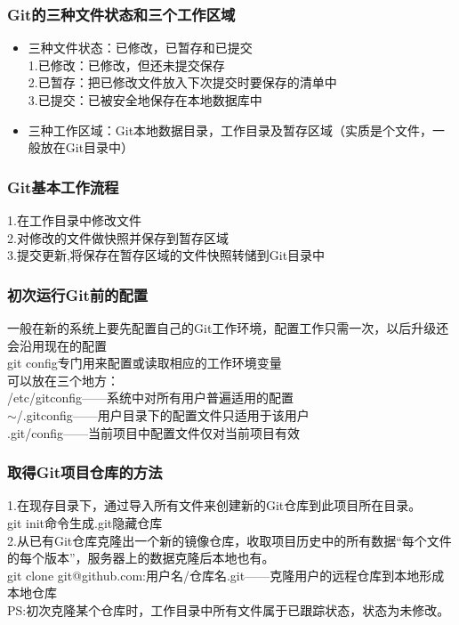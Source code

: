 \documentclass[12pt]{article}
\begin{document}
\begin{flushleft}
\begin{flushleft}
\begin{flushleft}
\begin{flushleft}
\subsubsection{Git的三种文件状态和三个工作区域}
\begin{flushleft}
\begin{itemize}
\item{\color{blue}三种文件状态：}已修改，已暂存和已提交\\
1.已修改：已修改，但还未提交保存\\
2.已暂存：把已修改文件放入下次提交时要保存的清单中\\
3.已提交：已被安全地保存在本地数据库中\\
\item{\color{blue}三种工作区域：}Git本地数据目录，工作目录及暂存区域（实质是个文件，一般放在Git目录中）
\end{itemize}
\end{flushleft}
\subsubsection{Git基本工作流程}
\begin{flushleft}
1.在工作目录中修改文件\\
2.对修改的文件做快照并保存到暂存区域\\
3.提交更新,将保存在暂存区域的文件快照转储到Git目录中
\end{flushleft}
\subsubsection{初次运行Git前的配置}
\begin{flushleft}
一般在新的系统上要先配置自己的Git工作环境，配置工作只需一次，以后升级还会沿用现在的配置\\
git config专门用来配置或读取相应的工作环境变量\\
可以放在三个地方：\\
\slash{}etc\slash{}gitconfig——系统中对所有用户普遍适用的配置\\
$\sim$\slash{}.gitconfig——用户目录下的配置文件只适用于该用户\\
.git\slash{}config——当前项目中配置文件仅对当前项目有效
\end{flushleft}
\subsubsection{取得Git项目仓库的方法}
\begin{flushleft}
1.在现存目录下，通过导入所有文件来创建新的Git仓库到此项目所在目录。\\
git init命令生成.git隐藏仓库\\
2.从已有Git仓库克隆出一个新的镜像仓库，收取项目历史中的所有数据``每个文件的每个版本''，服务器上的数据克隆后本地也有。\\
git clone git@github.com:用户名/仓库名.git——克隆用户的远程仓库到本地形成本地仓库\\
PS:初次克隆某个仓库时，工作目录中所有文件属于已跟踪状态，状态为未修改。
\end{flushleft}

\end{flushleft}
\end{flushleft}
\end{flushleft}
\end{flushleft}
\end{document}
